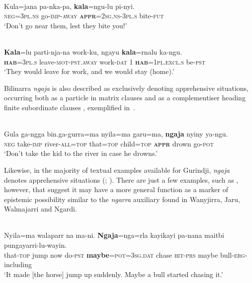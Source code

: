\documentclass[output=paper,colorlinks,citecolor=brown]{langscibook}
\begin{document}
\ea 
{} \\
\gll Kula=jana pa-nka-pa, \textbf{kala}=ngu-lu pi-nyi. \\
\textsc{neg=3pl.ns} go-\textsc{imp-away} \textsc{\textbf{appr}=2sg.ns-3pl.s} bite-\textsc{fut} \\
\glt `Don't go near them, lest they bite you!' 
\label{ex:bro58}
\z


\ea 
{} \\
\gll \textbf{Kala}=lu parti-nja-na work-ku, ngayu \textbf{kala}=rnalu ka-ngu. \\
\textsc{\textbf{hab}=3pl.s} leave-\textsc{mot-pst.away} work-\textsc{dat} 1 \textsc{\textbf{hab}=1pl.excl.s} be-\textsc{pst} \\
\glt `They would leave for work, and we would stay (home).'
\label{ex:bro59}
\z





Bilinarra \textit{ngaja} is also described as exclusively denoting apprehensive situations, occurring both as a particle in matrix clauses and as a complementiser heading finite subordinate clauses \citep[305, 419]{meakins_grammar_2014}, exemplified in~.

\ea 
{} \\
\gll Gula ga-ngga bin.ga-gurra=ma nyila=ma garu=ma, \textbf{ngaja} nyiny ya-ngu. \\
\textsc{neg} take-\textsc{imp} river-\textsc{all=top} that=\textsc{top} child=\textsc{top} \textsc{\textbf{appr}} drown go-\textsc{pot} \\
\glt `Don't take the kid to the river in case he drowns.'
\label{ex:bro60}
\z

 Likewise, in the majority of textual examples available for Gurindji, \textit{ngaja} denotes apprehensive situations (\cite[94--95]{mcconvell_gurindji_1996}; \cite[548--550]{meakinsmcconvell2021}). There are just a few examples, such as , however, that suggest it may have a more general function as a marker of epistemic possibility similar to the \textit{ngarra} auxiliary found in Wanyjirra, Jaru, Walmajarri and Ngardi.

\ea 
{} \\
\gll Nyila=ma walaparr na ma-ni. \textbf{Ngaja}=nga=rla kayikayi pa-nana maitbi pungayarri-lu-wayin. \\
that-\textsc{top} jump now do-\textsc{pst} \textbf{maybe}=\textsc{pot=3sg.dat} chase \textsc{hit-prs} maybe bull-\textsc{erg}-including \\
\glt `It made [the horse] jump up suddenly. Maybe a bull started chasing it.'
\label{ex:bro61}
\z
\end{document}
